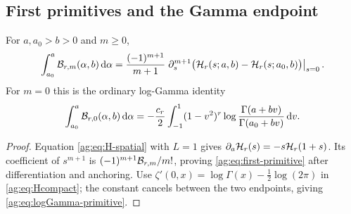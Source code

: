 \subsection{First primitives and the Gamma endpoint}
\begin{corollary}\label{ag:cor:primitive}
For $a,a_0>b>0$ and $m\ge0$,
\begin{equation}\label{ag:eq:first-primitive}
 \int_{a_0}^a\mathcal B_{r,m}(\alpha,b)\,\mathrm d\alpha
 =\frac{(-1)^{m+1}}{m+1}
  \left.\partial_s^{m+1}\bigl(\mathcal H_r(s;a,b)-\mathcal H_r(s;a_0,b)\bigr)\right|_{s=0}.
\end{equation}
For $m=0$ this is the ordinary log-Gamma identity
\begin{equation}\label{ag:eq:logGamma-primitive}
 \int_{a_0}^a\mathcal B_{r,0}(\alpha,b)\,\mathrm d\alpha
 =-\frac{c_r}{2}\int_{-1}^1(1-v^2)^r
       \log\frac{\Gamma(a+bv)}{\Gamma(a_0+bv)}\,\mathrm d v.
\end{equation}
\end{corollary}
\begin{proof}
Equation \eqref{ag:eq:H-spatial} with $L=1$ gives
$\partial_a\mathcal H_r(s)=-s\mathcal H_r(1+s)$. Its coefficient of $s^{m+1}$ is
$(-1)^{m+1}\mathcal B_{r,m}/m!$, proving
\eqref{ag:eq:first-primitive} after differentiation and anchoring.
Use $\zeta'(0,x)=\log\Gamma(x)-\tfrac12\log(2\pi)$
\cite{DLMFzeta} in \eqref{ag:eq:Hcompact}; the constant cancels between
the two endpoints, giving \eqref{ag:eq:logGamma-primitive}.
\end{proof}

